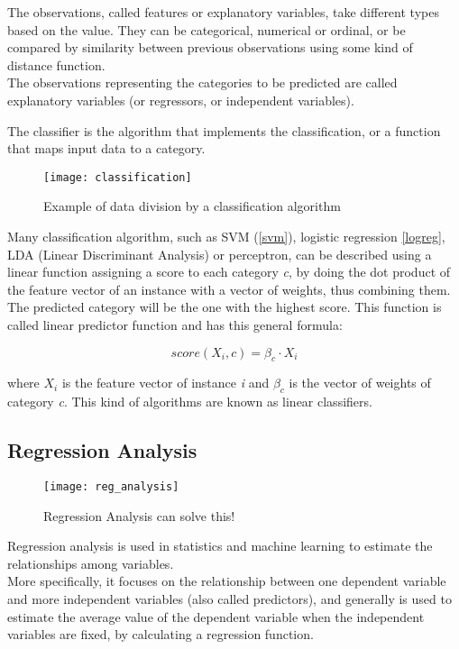 The observations, called features or explanatory variables, take different types based on the value. They can be categorical, numerical or ordinal, or be compared by similarity between previous observations using some kind of distance function.\\
The observations representing the categories to be predicted are called explanatory variables (or regressors, or independent variables).

The classifier is the algorithm that implements the classification, or a function that maps input data to a category.

\begin{figure}[H]
	\centering
	\texttt{[image: classification]}
	\caption{Example of data division by a classification algorithm}
	\label{fig:classification}
\end{figure}	

Many classification algorithm, such as SVM (\ref{svm}), logistic regression \ref{logreg}, LDA (Linear Discriminant Analysis) or perceptron, can be described using a linear function assigning a score to each category \textit{c}, by doing the dot product of the feature vector of an instance with a vector of weights, thus combining them. The predicted category will be the one with the highest score. This function is called linear predictor function and has this general formula:

\begin{equation}
score(X_i, c) = \beta_c \cdot X_i
\end{equation}

where $X_i$ is the feature vector of instance \textit{i} and $\beta_c$ is the vector of weights of category \textit{c}. This kind of algorithms are known as linear classifiers.

\subsection{Regression Analysis} \label{regression}
\begin{figure}[H]
	\centering
	\texttt{[image: reg\_analysis]}
	\caption{Regression Analysis can solve this! \cite{reg_analisys}}
	\label{fig:reg_analysis}
\end{figure}

Regression analysis is used in statistics and machine learning to estimate the relationships among variables. \\
More specifically, it focuses on the relationship between one dependent variable and more independent variables (also called predictors), and generally is used to estimate the average value of the dependent variable when the independent variables are fixed, by calculating a regression function.

